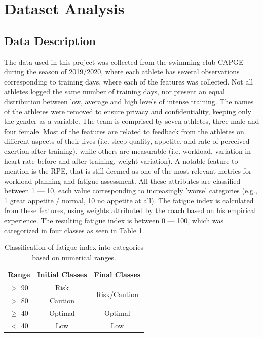\documentclass[conference]{IEEEtran}
\begin{document}
\section{Dataset Analysis}

\subsection{Data Description}

The data used in this project was collected from the swimming club CAPGE during the season of 2019/2020, where each athlete has several observations corresponding to training days, where each of the features was collected. Not all athletes logged the same number of training days, nor present an equal distribution between low, average and high levels of intense training. The names of the athletes were removed to ensure privacy and confidentiality, keeping only the gender as a variable. The team is comprised by seven athletes, three male and four female. Most of the features are related to feedback from the athletes on different aspects of their lives (i.e. sleep quality, appetite, and rate of perceived exertion after training), while others are measurable (i.e. workload, variation in heart rate before and after training, weight variation). A notable feature to mention is the RPE, that is still deemed as one of the most relevant metrics for workload planning and fatigue assessment. All these attributes are classified between 1 — 10, each value corresponding to increasingly 'worse' categories (e.g., 1 great appetite / normal, 10 no appetite at all).
The fatigue index is calculated from these features, using weights attributed by the coach based on his empirical experience. The resulting fatigue index is between 0 — 100, which was categorized in four classes as seen in Table \ref{classTable}. 


\begin{table}[H]
\centering
\caption{Classification of fatigue index into categories based on numerical ranges.}
\label{classTable}
\begin{tabular}{|c|c|c|}
    \hline
    \textbf{Range} & \textbf{Initial Classes} & \textbf{Final Classes} \\ \hline
    $>$ 90 & Risk    & \multirow{2}{*}{Risk/Caution} \\ \cline{1-2}
    $>$ 80 & Caution & \\ \hline
    $\geq$ 40 & Optimal & Optimal \\ \hline
    $<$ 40  & Low     & Low \\ \hline
\end{tabular}
\end{table}
\end{document}
